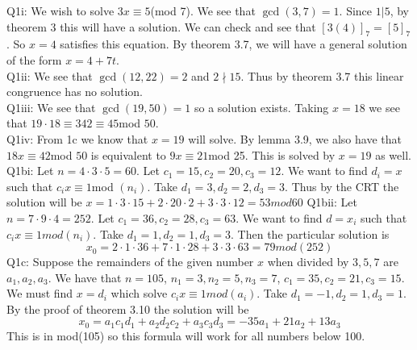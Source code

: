 \documentclass[letterpaper]{article}
\begin{document}
\noindent Q1i: We wish to solve $3x \equiv 5$(mod 7). We see that $\gcd(3,7)=1$. Since $1|5$, by theorem 3 this will have a solution. We can check and see that $[3(4)]_7=[5]_7$. So $x=4$ satisfies this equation. By theorem 3.7, we will have a general solution of the form $x=4+7t$.
\newline \\ Q1ii: We see that $\gcd(12,22) =2$ and $2\nmid 15$. Thus by theorem 3.7 this linear congruence has no solution.
\newline \\ Q1iii: We see that $\gcd(19,50)=1$ so a solution exists. Taking $x=18$ we see that $19\cdot 18 \equiv 342 \equiv 45 $mod $50$. 
\newline \\ Q1iv: From 1c we know that $x=19$ will solve. By lemma 3.9, we also have that $18x \equiv 42 $mod $50$ is equivalent to $9x\equiv 21 $mod 25. This is solved by $x=19$ as well. 
\newline Q1bi: Let $n=4\cdot 3\cdot 5 = 60$. Let $c_1=15,c_2=20,c_3=12$. We want to find $d_i=x$ such that $c_ix \equiv 1 $mod $(n_i)$. Take $d_1=3, d_2= 2, d_3 = 3$. Thus by the CRT the solution will be $x = 1\cdot 3\cdot 15 + 2\cdot 20\cdot 2 + 3\cdot 3\cdot 12=53 mod 60$
\newline Q1bii: Let $n=7\cdot 9 \cdot 4 = 252$. Let $c_1=36,c_2=28,c_3=63$. We want to find $d=x_i$ such that $c_ix\equiv 1 mod(n_i)$. Take $d_1=1,d_2=1,d_3=3$. Then the particular solution is $$x_0=2\cdot 1\cdot 36 + 7\cdot 1\cdot 28 + 3\cdot 3\cdot 63 = 79mod(252)$$
\newline Q1c: Suppose the remainders of the given number $x$ when divided by $3,5,7$ are $a_1,a_2,a_3$. We have that $n=105$, $n_1=3,n_2=5,n_3=7$, $c_1=35,c_2=21,c_3=15$. We must find $x=d_i$ which solve $c_i x \equiv 1 mod (a_i)$. Take $d_1=-1,d_2=1,d_3=1$. By the proof of theorem 3.10 the solution will be $$x_0= a_1 c_1 d_1 + a_2 d_2 c_2 + a_3 c_3 d_3 = -35a_1+21a_2+13a_3$$ This is in mod(105) so this formula will work for all numbers below 100.
\end{document}
